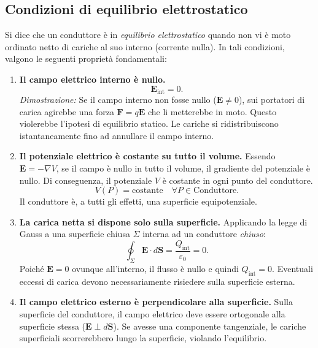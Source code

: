 \documentclass[a4paper,11pt]{report}
\begin{document}
\subsection{Condizioni di equilibrio elettrostatico}
Si dice che un conduttore è in \textit{equilibrio elettrostatico} quando non vi è moto ordinato netto di cariche al suo interno (corrente nulla). In tali condizioni, valgono le seguenti proprietà fondamentali:

\begin{enumerate}
    \item \textbf{Il campo elettrico interno è nullo.}
    \begin{equation}
        \bm{E}_{\text{int}} = 0.
    \end{equation}
    \textit{Dimostrazione:} Se il campo interno non fosse nullo ($\bm{E} \neq 0$), sui portatori di carica agirebbe una forza $\bm{F} = q\bm{E}$ che li metterebbe in moto. Questo violerebbe l'ipotesi di equilibrio statico. Le cariche si ridistribuiscono istantaneamente fino ad annullare il campo interno.

    \item \textbf{Il potenziale elettrico è costante su tutto il volume.}
    Essendo $\bm{E} = -\nabla V$, se il campo è nullo in tutto il volume, il gradiente del potenziale è nullo. Di conseguenza, il potenziale $V$ è costante in ogni punto del conduttore.
    \begin{equation}
        V(P) = \text{costante} \quad \forall P \in \text{Conduttore}.
    \end{equation}
    Il conduttore è, a tutti gli effetti, una superficie equipotenziale.

    \item \textbf{La carica netta si dispone solo sulla superficie.}
    Applicando la legge di Gauss a una superficie chiusa $\Sigma$ interna ad un conduttore \textit{chiuso}:
    \begin{equation}
        \oint_{\Sigma} \bm{E} \cdot d\bm{S} = \frac{Q_{\text{int}}}{\varepsilon_0} = 0.
    \end{equation}
    Poiché $\bm{E}=0$ ovunque all'interno, il flusso è nullo e quindi $Q_{\text{int}} = 0$. Eventuali eccessi di carica devono necessariamente risiedere sulla superficie esterna.

    \item \textbf{Il campo elettrico esterno è perpendicolare alla superficie.}
    Sulla superficie del conduttore, il campo elettrico deve essere ortogonale alla superficie stessa ($\bm{E} \perp d\bm{S}$). Se avesse una componente tangenziale, le cariche superficiali scorrerebbero lungo la superficie, violando l'equilibrio.
\end{enumerate}
\end{document}
